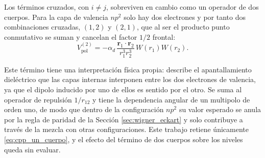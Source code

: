 Los términos cruzados, con $i \neq j$, sobreviven en cambio como un operador de dos cuerpos. Para la capa de valencia $np^2$ solo hay dos electrones y por tanto dos combinaciones cruzadas, $(1,2)$ y $(2,1)$, que al ser el producto punto conmutativo se suman y cancelan el factor $1/2$ frontal:
\begin{equation}
    \label{eq:cpp_dos_cuerpos}
    V_{\text{pol}}^{(2)} = -\alpha_d\,\frac{\bm{r}_1 \cdot \bm{r}_2}{r_1^3 r_2^3}\,W(r_1)W(r_2).
\end{equation}

Este término tiene una interpretación física propia: describe el apantallamiento dieléctrico que las capas internas interponen entre los dos electrones de valencia, ya que el dipolo inducido por uno de ellos es sentido por el otro. Se suma al operador de repulsión $1/r_{12}$ y tiene la dependencia angular de un multipolo de orden uno, de modo que dentro de la configuración $np^2$ su valor esperado se anula por la regla de paridad de la Sección \ref{sec:wigner_eckart} y solo contribuye a través de la mezcla con otras configuraciones. Este trabajo retiene únicamente \eqref{eq:cpp_un_cuerpo}, y el efecto del término de dos cuerpos sobre los niveles queda sin evaluar.
